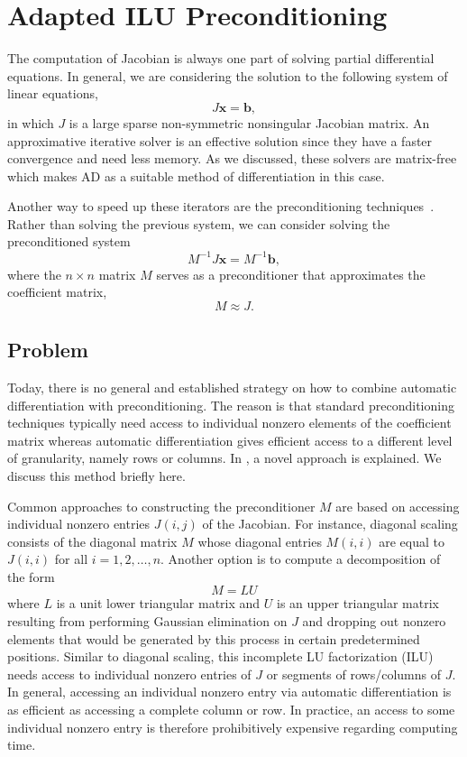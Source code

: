 \documentclass[11pt, twoside,a4paper]{book}
\newcommand{\vek}[1]{{\ensuremath{\mathbf #1}}}
\begin{document}
\section{Adapted ILU Preconditioning}
\label{s.precond}
The computation of Jacobian is always one part of solving partial differential equations.
In general, we are considering the solution to the following system of linear equations,
$$
J\vek{x} = \vek{b},
$$
in which $J$ is a large sparse non-symmetric nonsingular Jacobian matrix. An approximative iterative solver is an
effective solution since they have a faster convergence and need less memory. As we discussed,
these solvers are matrix-free which makes AD as a suitable method of differentiation in this case.

Another way to speed up these iterators are
the preconditioning techniques~\cite{precond1,precond2}.
Rather than solving the previous system,
we can consider solving the preconditioned system
\begin{equation}
\label{e:precond}
M^{-1} J \vek{x}= M^{-1}\vek{b},
\end{equation}
where the $n \times n$ matrix $M$ serves as a preconditioner that approximates
the coefficient matrix,
$$M \approx J.$$

\subsection{Problem}
\label{ss.problem.precond}
Today, there is no general and established
strategy on how to combine automatic differentiation with preconditioning. The reason is
that standard preconditioning techniques typically need access to individual nonzero
elements of the coefficient matrix whereas automatic differentiation gives efficient
access to a different level of granularity, namely rows or columns.
In \cite{Lulfesmann2012Fap}, a novel approach is explained.
We discuss this method briefly here.

Common approaches to constructing the preconditioner $M$ are based on accessing individual
nonzero entries $J(i,j)$ of the Jacobian. For instance, diagonal scaling consists of the
diagonal matrix $M$ whose diagonal entries $M(i,i)$ are equal to $J(i,i)$ for all
$i=1,2,\dots, n$. Another option is to compute a decomposition of the form
$$M = LU$$
where $L$ is a unit lower triangular matrix and $U$ is an upper triangular matrix
resulting from performing Gaussian elimination on $J$ and dropping out nonzero elements
that would be generated by this process in certain predetermined positions. Similar to
diagonal scaling, this incomplete LU factorization (ILU) needs access to individual
nonzero entries of $J$ or segments of rows/columns of $J$. In general, accessing an
individual nonzero entry via automatic differentiation is as efficient as accessing a
complete column or row. In practice, an access to some individual nonzero entry is
therefore prohibitively expensive regarding computing time.
\end{document}
